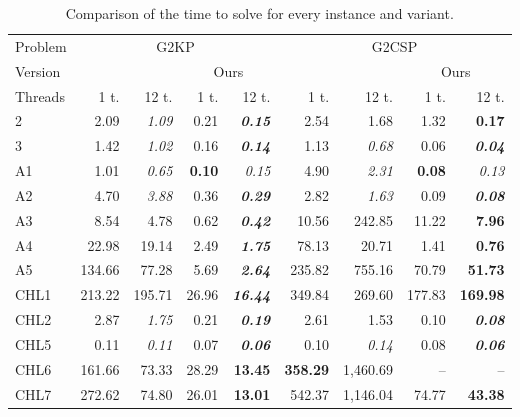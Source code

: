 \documentclass[9pt]{entcs}
\begin{document}
\begin{table}[ht]
\caption{Comparison of the time to solve for every instance and variant.}
\begin{tabular}{@{\extracolsep{4pt}}lrrrrrrrr@{}}
\hline\hline
Problem & \multicolumn{4}{c}{G2KP} & \multicolumn{4}{c}{G2CSP}\\\cline{2-5}\cline{6-9}
Version & \multicolumn{2}{c}{\cite{furini:2016}} & \multicolumn{2}{c}{Ours} & \multicolumn{2}{c}{\cite{furini:2016}} & \multicolumn{2}{c}{Ours}\\\cline{2-3}\cline{4-5}\cline{6-7}\cline{8-9}
Threads & 1 t. & 12 t. & 1 t. & 12 t. & 1 t. & 12 t. & 1 t. & 12 t. \\\hline
2 & 2.09 & \textit{1.09} & 0.21 & \textbf{\textit{0.15}} & 2.54 & 1.68 & 1.32 & \textbf{0.17} \\
3 & 1.42 & \textit{1.02} & 0.16 & \textbf{\textit{0.14}} & 1.13 & \textit{0.68} & 0.06 & \textbf{\textit{0.04}} \\
A1 & 1.01 & \textit{0.65} & \textbf{0.10} & \textit{0.15} & 4.90 & \textit{2.31} & \textbf{0.08} & \textit{0.13} \\
A2 & 4.70 & \textit{3.88} & 0.36 & \textbf{\textit{0.29}} & 2.82 & \textit{1.63} & 0.09 & \textbf{\textit{0.08}} \\
A3 & 8.54 & 4.78 & 0.62 & \textbf{\textit{0.42}} & 10.56 & 242.85 & 11.22 & \textbf{7.96} \\
A4 & 22.98 & 19.14 & 2.49 & \textbf{\textit{1.75}} & 78.13 & 20.71 & 1.41 & \textbf{0.76} \\
A5 & 134.66 & 77.28 & 5.69 & \textbf{\textit{2.64}} & 235.82 & 755.16 & 70.79 & \textbf{51.73} \\
CHL1 & 213.22 & 195.71 & 26.96 & \textbf{\textit{16.44}} & 349.84 & 269.60 & 177.83 & \textbf{169.98} \\
CHL2 & 2.87 & \textit{1.75} & 0.21 & \textbf{\textit{0.19}} & 2.61 & 1.53 & 0.10 & \textbf{\textit{0.08}} \\
CHL5 & 0.11 & \textit{0.11} & 0.07 & \textbf{\textit{0.06}} & 0.10 & \textit{0.14} & 0.08 & \textbf{\textit{0.06}} \\
CHL6 & 161.66 & 73.33 & 28.29 & \textbf{13.45} & \textbf{358.29} & 1,460.69 & -- & -- \\
CHL7 & 272.62 & 74.80 & 26.01 & \textbf{13.01} & 542.37 & 1,146.04 & 74.77 & \textbf{43.38} \\

\end{tabular}
\end{table}
\end{document}
